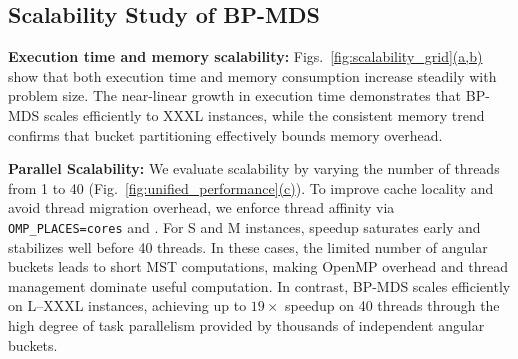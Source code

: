 




\subsection{Scalability Study of BP-MDS}
\label{sec:strong_scaling}

\textbf{Execution time and memory scalability:} Figs.~\hyperref[fig:scalability_grid]{\ref*{fig:scalability_grid}(a,b)} show that both execution time and memory consumption increase steadily with problem size. The near-linear growth in execution time demonstrates that BP-MDS scales efficiently to XXXL instances, while the consistent memory trend confirms that bucket partitioning effectively bounds memory overhead.


\textbf{Parallel Scalability:} We evaluate scalability by varying the number of threads from 1 to 40 (Fig.~\hyperref[fig:unified_performance]{\ref*{fig:unified_performance}(c)}). To improve cache locality and avoid thread migration overhead, we enforce thread affinity via \texttt{OMP\_PLACES=cores} and . For S and M instances, speedup saturates early and stabilizes well before 40 threads. In these cases, the limited number of angular buckets leads to short MST computations, making OpenMP overhead and thread management dominate useful computation.  In contrast, BP-MDS scales efficiently on L--XXXL instances, achieving up to $19\times$ speedup on 40 threads through the high degree of task parallelism provided by thousands of independent angular buckets.

